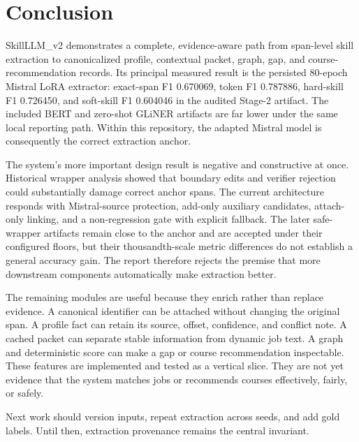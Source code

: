 \chapter{Conclusion}
\label{ch:conclusion}

SkillLLM\_v2 demonstrates a complete, evidence-aware path from span-level skill extraction to canonicalized profile, contextual packet, graph, gap, and course-recommendation records. Its principal measured result is the persisted 80-epoch Mistral LoRA extractor: exact-span F1 0.670069, token F1 0.787886, hard-skill F1 0.726450, and soft-skill F1 0.604046 in the audited Stage-2 artifact. The included BERT and zero-shot GLiNER artifacts are far lower under the same local reporting path. Within this repository, the adapted Mistral model is consequently the correct extraction anchor.

The system's more important design result is negative and constructive at once. Historical wrapper analysis showed that boundary edits and verifier rejection could substantially damage correct anchor spans. The current architecture responds with Mistral-source protection, add-only auxiliary candidates, attach-only linking, and a non-regression gate with explicit fallback. The later safe-wrapper artifacts remain close to the anchor and are accepted under their configured floors, but their thousandth-scale metric differences do not establish a general accuracy gain. The report therefore rejects the premise that more downstream components automatically make extraction better.

The remaining modules are useful because they enrich rather than replace evidence. A canonical identifier can be attached without changing the original span. A profile fact can retain its source, offset, confidence, and conflict note. A cached packet can separate stable information from dynamic job text. A graph and deterministic score can make a gap or course recommendation inspectable. These features are implemented and tested as a vertical slice. They are not yet evidence that the system matches jobs or recommends courses effectively, fairly, or safely.

Next work should version inputs, repeat extraction across seeds, and add gold labels. Until then, extraction provenance remains the central invariant.
